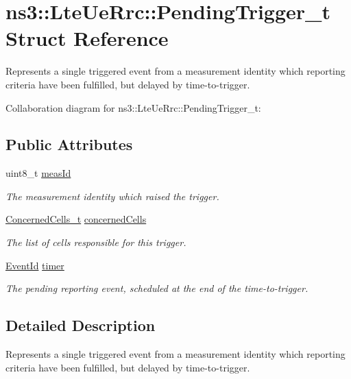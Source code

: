 \hypertarget{structns3_1_1LteUeRrc_1_1PendingTrigger__t}{}\section{ns3\+:\+:Lte\+Ue\+Rrc\+:\+:Pending\+Trigger\+\_\+t Struct Reference}
\label{structns3_1_1LteUeRrc_1_1PendingTrigger__t}


Represents a single triggered event from a measurement identity which reporting criteria have been fulfilled, but delayed by time-\/to-\/trigger.  




Collaboration diagram for ns3\+:\+:Lte\+Ue\+Rrc\+:\+:Pending\+Trigger\+\_\+t\+:
\subsection*{Public Attributes}
\begin{DoxyCompactItemize}
\item 
uint8\+\_\+t \hyperlink{structns3_1_1LteUeRrc_1_1PendingTrigger__t_a61252cbc490480a84f98ecb4e6515316}{meas\+Id}
\begin{DoxyCompactList}\small\item\em The measurement identity which raised the trigger. \end{DoxyCompactList}\item 
\hyperlink{classns3_1_1LteUeRrc_abe2ee6e993c02a8e5e924bc777e3fa5c}{Concerned\+Cells\+\_\+t} \hyperlink{structns3_1_1LteUeRrc_1_1PendingTrigger__t_a4c34f72ae48feacf85417de09880f43f}{concerned\+Cells}
\begin{DoxyCompactList}\small\item\em The list of cells responsible for this trigger. \end{DoxyCompactList}\item 
\hyperlink{classns3_1_1EventId}{Event\+Id} \hyperlink{structns3_1_1LteUeRrc_1_1PendingTrigger__t_a55eec70e8b5d51918bff56d2ca04cbaa}{timer}
\begin{DoxyCompactList}\small\item\em The pending reporting event, scheduled at the end of the time-\/to-\/trigger. \end{DoxyCompactList}\end{DoxyCompactItemize}


\subsection{Detailed Description}
Represents a single triggered event from a measurement identity which reporting criteria have been fulfilled, but delayed by time-\/to-\/trigger. 

